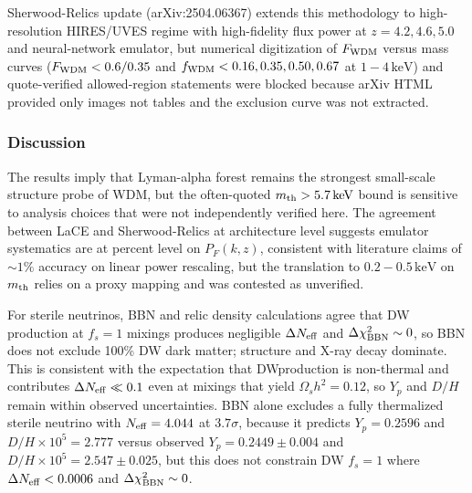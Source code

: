 \documentclass[11pt,a4paper]{article}
\begin{document}
Sherwood-Relics update (arXiv:2504.06367) extends this methodology to high-resolution HIRES/UVES regime with high-fidelity flux power at $z = 4.2, 4.6, 5.0$ and neural-network emulator, but numerical digitization of $F_{\rm WDM}$ versus mass curves ($F_{\rm WDM} < 0.6/0.35$ and $f_{\rm WDM} < 0.16,0.35,0.50,0.67$ at $1-4\,\mathrm{keV}$) and quote-verified allowed-region statements were blocked because arXiv HTML provided only images not tables and the exclusion curve was not extracted.

\subsubsection*{Discussion}
The results imply that Lyman-alpha forest remains the strongest small-scale structure probe of WDM, but the often-quoted $m_{\rm th} > 5.7\,\mathrm{keV}$ bound is sensitive to analysis choices that were not independently verified here. The agreement between LaCE and Sherwood-Relics at architecture level suggests emulator systematics are at percent level on $P_F(k,z)$, consistent with literature claims of $\sim 1\%$ accuracy on linear power rescaling, but the translation to $0.2-0.5\,\mathrm{keV}$ on $m_{\rm th}$ relies on a proxy mapping and was contested as unverified.

For sterile neutrinos, BBN and relic density calculations agree that DW production at $f_s=1$ mixings produces negligible $\Delta N_{\rm eff}$ and $\Delta\chi^2_{\rm BBN} \sim 0$, so BBN does not exclude 100\% DW dark matter; structure and X-ray decay dominate. This is consistent with the expectation that DWproduction is non-thermal and contributes $\Delta N_{\rm eff} \ll 0.1$ even at mixings that yield $\Omega_s h^2 = 0.12$, so $Y_p$ and $D/H$ remain within observed uncertainties. BBN alone excludes a fully thermalized sterile neutrino with $N_{\rm eff} = 4.044$ at $3.7\sigma$, because it predicts $Y_p = 0.2596$ and $D/H \times 10^5 = 2.777$ versus observed $Y_p = 0.2449 \pm 0.004$ and $D/H \times 10^5 = 2.547 \pm 0.025$, but this does not constrain DW $f_s = 1$ where $\Delta N_{\rm eff} < 0.0006$ and $\Delta\chi^2_{\rm BBN} \sim 0$.
\end{document}
